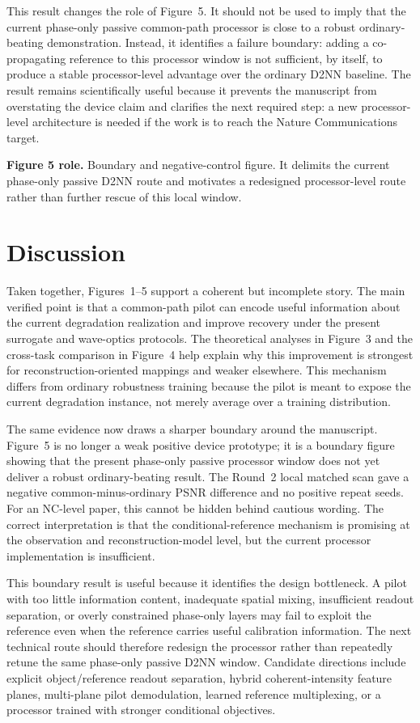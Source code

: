 \documentclass[11pt]{article}
\begin{document}
This result changes the role of Figure~5. It should not be used to imply that the current phase-only passive common-path processor is close to a robust ordinary-beating demonstration. Instead, it identifies a failure boundary: adding a co-propagating reference to this processor window is not sufficient, by itself, to produce a stable processor-level advantage over the ordinary D2NN baseline. The result remains scientifically useful because it prevents the manuscript from overstating the device claim and clarifies the next required step: a new processor-level architecture is needed if the work is to reach the Nature Communications target.

\textbf{Figure 5 role.} Boundary and negative-control figure. It delimits the current phase-only passive D2NN route and motivates a redesigned processor-level route rather than further rescue of this local window.


\section{Discussion}
Taken together, Figures~1--5 support a coherent but incomplete story. The main verified point is that a common-path pilot can encode useful information about the current degradation realization and improve recovery under the present surrogate and wave-optics protocols. The theoretical analyses in Figure~3 and the cross-task comparison in Figure~4 help explain why this improvement is strongest for reconstruction-oriented mappings and weaker elsewhere. This mechanism differs from ordinary robustness training because the pilot is meant to expose the current degradation instance, not merely average over a training distribution.

The same evidence now draws a sharper boundary around the manuscript. Figure~5 is no longer a weak positive device prototype; it is a boundary figure showing that the present phase-only passive processor window does not yet deliver a robust ordinary-beating result. The Round~2 local matched scan gave a negative common-minus-ordinary PSNR difference and no positive repeat seeds. For an NC-level paper, this cannot be hidden behind cautious wording. The correct interpretation is that the conditional-reference mechanism is promising at the observation and reconstruction-model level, but the current processor implementation is insufficient.

This boundary result is useful because it identifies the design bottleneck. A pilot with too little information content, inadequate spatial mixing, insufficient readout separation, or overly constrained phase-only layers may fail to exploit the reference even when the reference carries useful calibration information. The next technical route should therefore redesign the processor rather than repeatedly retune the same phase-only passive D2NN window. Candidate directions include explicit object/reference readout separation, hybrid coherent-intensity feature planes, multi-plane pilot demodulation, learned reference multiplexing, or a processor trained with stronger conditional objectives.
\end{document}
